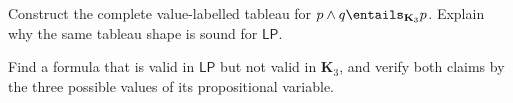 \begin{exercise}
\label{ex:many-valued-paraconsistent-01}
Construct the complete value-labelled tableau for
\(p\land q\entails_{\mathbf K_3}p\).  Explain why the same tableau shape is
sound for \(\mathsf{LP}\).
\end{exercise}

\begin{exercise}
\label{ex:many-valued-paraconsistent-02}
Find a formula that is valid in \(\mathsf{LP}\) but not valid in
\(\mathbf K_3\), and verify both claims by the three possible values of its
propositional variable.
\end{exercise}

